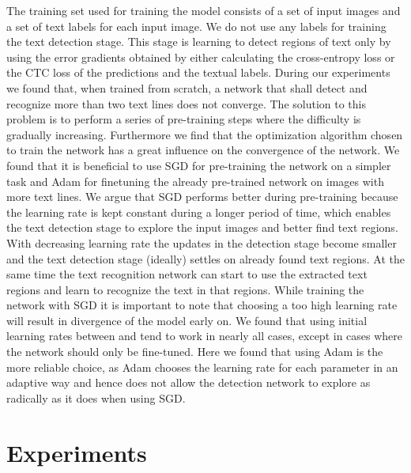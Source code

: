 \documentclass[10pt,twocolumn,letterpaper]{article}
\begin{document}
The training set  used for training the model consists of a set of input images  and a set of text labels  for each input image.
We do not use any labels for training the text detection stage.
This stage is learning to detect regions of text only by using the error gradients obtained by either calculating the cross-entropy loss or the \ac{CTC} loss of the predictions and the textual labels.
During our experiments we found that, when trained from scratch, a network that shall detect and recognize more than two text lines does not converge.
The solution to this problem is to perform a series of pre-training steps where the difficulty is gradually increasing.
Furthermore we find that the optimization algorithm chosen to train the network has a great influence on the convergence of the network.
We found that it is beneficial to use \ac{SGD} for pre-training the network on a simpler task and Adam \cite{Kingma2015Adam} for finetuning the already pre-trained network on images with more text lines.
We argue that \ac{SGD} performs better during pre-training because the learning rate  is kept constant during a longer period of time, which enables the text detection stage to explore the input images and better find text regions.
With decreasing learning rate the updates in the detection stage become smaller and the text detection stage (ideally) settles on already found text regions.
At the same time the text recognition network can start to use the extracted text regions and learn to recognize the text in that regions.
While training the network with \ac{SGD} it is important to note that choosing a too high learning rate will result in divergence of the model early on.
We found that using initial learning rates between  and  tend to work in nearly all cases, except in cases where the network should only be fine-tuned.
Here we found that using Adam is the more reliable choice, as Adam chooses the learning rate for each parameter in an adaptive way and hence does not allow the detection network to explore as radically as it does when using \ac{SGD}.



%
 
	\section{Experiments}
\label{sec:experiments}
\end{document}
